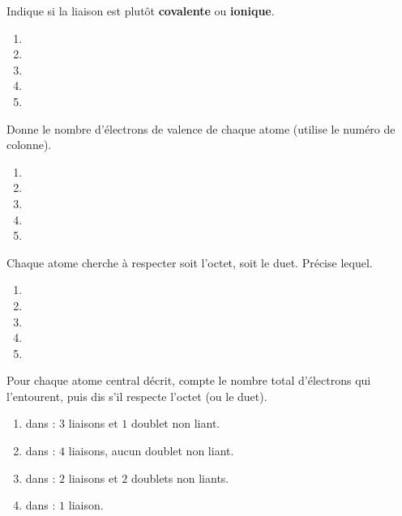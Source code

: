 \documentclass[11pt,a4paper]{article}
\begin{document}
\begin{exo}
Indique si la liaison est plutôt \textbf{covalente} ou \textbf{ionique}.
\begin{enumerate}[label=\alph*)]
  \item {}
  \item {}
  \item {}
  \item {}
  \item {}
\end{enumerate}
\end{exo}

\begin{exo}
Donne le nombre d'électrons de valence de chaque atome (utilise le numéro de colonne).
\begin{enumerate}[label=\alph*)]
  \item {}
  \item {}
  \item {}
  \item {}
  \item {}
\end{enumerate}
\end{exo}

\begin{exo}
Chaque atome cherche à respecter soit l'octet, soit le duet. Précise lequel.
\begin{enumerate}[label=\alph*)]
  \item {}
  \item {}
  \item {}
  \item {}
  \item {}
\end{enumerate}
\end{exo}

\begin{exo}
Pour chaque atome central décrit, compte le nombre total d'électrons qui l'entourent, puis dis
s'il respecte l'octet (ou le duet).
\begin{enumerate}[label=\alph*)]
  \item {} dans  : $3$ liaisons et $1$ doublet non liant.
  \item {} dans  : $4$ liaisons, aucun doublet non liant.
  \item {} dans  : $2$ liaisons et $2$ doublets non liants.
  \item {} dans  : $1$ liaison.
\end{enumerate}
\end{exo}
\end{document}
